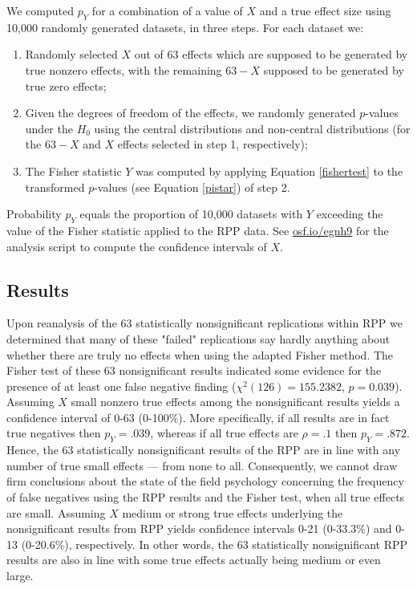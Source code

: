 \documentclass{article}
\begin{document}
We computed $p_Y$ for a combination of a value of $X$ and a true effect size using 10,000 randomly generated datasets, in three steps. For each dataset we: 
\begin{enumerate}
\item Randomly selected $X$ out of 63 effects which are supposed to be generated by true nonzero effects, with the remaining $63-X$ supposed to be generated by true zero effects;
\item Given the degrees of freedom of the effects, we randomly generated $p$-values under the $H_0$ using the central distributions and non-central distributions (for the $63-X$ and $X$ effects selected in step 1, respectively);
\item The Fisher statistic $Y$ was computed by applying Equation \ref{fishertest} to the transformed $p$-values (see Equation \ref{pistar}) of step 2. 
\end{enumerate}
Probability $p_Y$ equals the proportion of 10,000 datasets with $Y$ exceeding the value of the Fisher statistic applied to the RPP data. See \url{osf.io/egnh9} for the analysis script to compute the confidence intervals of $X$. 

\subsection*{Results}



Upon reanalysis of the 63 statistically nonsignificant replications within RPP we determined that many of these "failed" replications say hardly anything about whether there are truly no effects when using the adapted Fisher method. The Fisher test of these 63 nonsignificant results indicated some evidence for the presence of at least one false negative finding ($\chi^2(126)=155.2382$, $p=0.039$). Assuming $X$ small nonzero true effects among the nonsignificant results yields a confidence interval of 0-63 (0-100\%). More specifically, if all results are in fact true negatives then $p_Y=.039$, whereas if all true effects are $\rho=.1$ then $p_Y=.872$. Hence, the 63 statistically nonsignificant results of the RPP are in line with any number of true small effects --- from none to all. Consequently, we cannot draw firm conclusions about the state of the field psychology concerning the frequency of false negatives using the RPP results and the Fisher test, when all true effects are small. Assuming $X$ medium or strong true effects underlying the nonsignificant results from RPP yields confidence intervals 0-21 (0-33.3\%) and 0-13 (0-20.6\%), respectively. In other words, the 63 statistically nonsignificant RPP results are also in line with some true effects actually being medium or even large.
\end{document}
